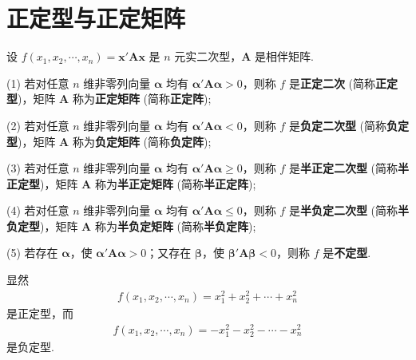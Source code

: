 \documentclass[../../main.tex]{subfiles}
\begin{document}
\section{正定型与正定矩阵}

\begin{definition}
设 $f(x_1,x_2,\cdots,x_n)=\boldsymbol{x}'\boldsymbol{A}\boldsymbol{x}$ 是 $n$ 元实二次型，$\boldsymbol{A}$ 是相伴矩阵.

(1) 若对任意 $n$ 维非零列向量 $\boldsymbol{\alpha}$ 均有 $\boldsymbol{\alpha}'\boldsymbol{A}\boldsymbol{\alpha}>0$，则称 $f$ 是\textbf{正定二次} (简称\textbf{正定型})，矩阵 $\boldsymbol{A}$ 称为\textbf{正定矩阵} (简称\textbf{正定阵});

(2) 若对任意 $n$ 维非零列向量 $\boldsymbol{\alpha}$ 均有 $\boldsymbol{\alpha}'\boldsymbol{A}\boldsymbol{\alpha}<0$，则称 $f$ 是\textbf{负定二次型} (简称\textbf{负定型})，矩阵 $\boldsymbol{A}$ 称为\textbf{负定矩阵} (简称\textbf{负定阵});

(3) 若对任意 $n$ 维非零列向量 $\boldsymbol{\alpha}$ 均有 $\boldsymbol{\alpha}'\boldsymbol{A}\boldsymbol{\alpha}\geq0$，则称 $f$ 是\textbf{半正定二次型} (简称\textbf{半正定型})，矩阵 $\boldsymbol{A}$ 称为\textbf{半正定矩阵} (简称\textbf{半正定阵});

(4) 若对任意 $n$ 维非零列向量 $\boldsymbol{\alpha}$ 均有 $\boldsymbol{\alpha}'\boldsymbol{A}\boldsymbol{\alpha}\leq0$，则称 $f$ 是\textbf{半负定二次型} (简称\textbf{半负定型})，矩阵 $\boldsymbol{A}$ 称为\textbf{半负定矩阵} (简称\textbf{半负定阵});

(5) 若存在 $\boldsymbol{\alpha}$，使 $\boldsymbol{\alpha}'\boldsymbol{A}\boldsymbol{\alpha}>0$；又存在 $\boldsymbol{\beta}$，使 $\boldsymbol{\beta}'\boldsymbol{A}\boldsymbol{\beta}<0$，则称 $f$ 是\textbf{不定型}.
\end{definition}
\begin{remark}
显然
\begin{align*}
f(x_1,x_2,\cdots,x_n)=x_1^2 + x_2^2 + \cdots + x_n^2
\end{align*}
是正定型，而
\begin{align*}
f(x_1,x_2,\cdots,x_n)=-x_1^2 - x_2^2 - \cdots - x_n^2
\end{align*}
是负定型. 
\end{remark}
\end{document}
